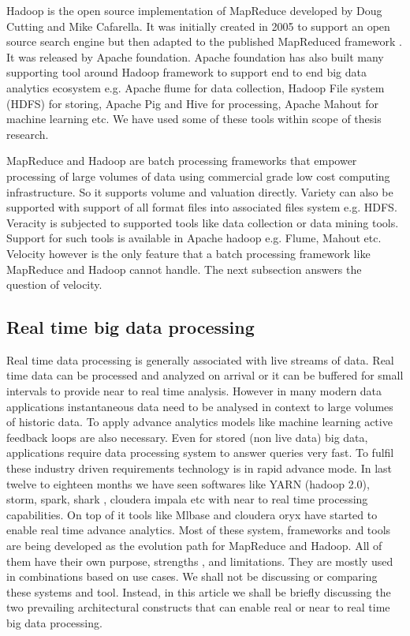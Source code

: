 Hadoop is the open source implementation of MapReduce developed by Doug Cutting and Mike Cafarella. It was initially created in 2005 to support an open source search engine but then adapted to the published MapReduced framework \cite{dean2008mapreduce}. It was released by Apache foundation. Apache foundation has also built many supporting tool around Hadoop framework to support end to end big data analytics ecosystem e.g. Apache flume for data collection, Hadoop File system (HDFS) for storing, Apache Pig and Hive for processing, Apache Mahout for machine learning etc. We have used some of these tools within scope of thesis research. 

MapReduce and Hadoop are batch processing frameworks that empower processing of large volumes of data using commercial grade low cost computing infrastructure. So it supports volume and valuation directly. Variety can also be supported with support of all format files into associated files system e.g. HDFS.  Veracity is subjected to supported tools like data collection or data mining tools. Support for such tools is available in Apache hadoop e.g. Flume, Mahout etc. Velocity however is the only feature that a batch processing framework like MapReduce and Hadoop cannot handle. The next subsection answers the question of velocity.

\subsection{ Real time big data processing }
Real time data processing is generally associated with live streams of data. Real time data can be processed and analyzed on arrival or it can be buffered for small intervals to provide near to real time analysis. However in many modern data applications instantaneous data need to be analysed in context to large volumes of historic data. To apply advance analytics models like machine learning active feedback loops are also necessary.  Even for stored (non live data) big data, applications require data processing system to answer queries very fast. To fulfil these industry driven requirements technology is in rapid advance mode. In last twelve to eighteen months we have seen softwares like YARN (hadoop 2.0), storm, spark, shark , cloudera impala etc with near to real time processing capabilities. On top of it tools like Mlbase and cloudera oryx have started to enable real time advance analytics. Most of these system, frameworks and tools are being developed as the evolution path for MapReduce and Hadoop. All of them have their own purpose, strengths , and limitations. They are mostly used in combinations based on use cases. We shall not be discussing or comparing these systems and tool. Instead, in this article we shall be briefly discussing the two prevailing architectural constructs that can enable real or near to real time big data processing.

